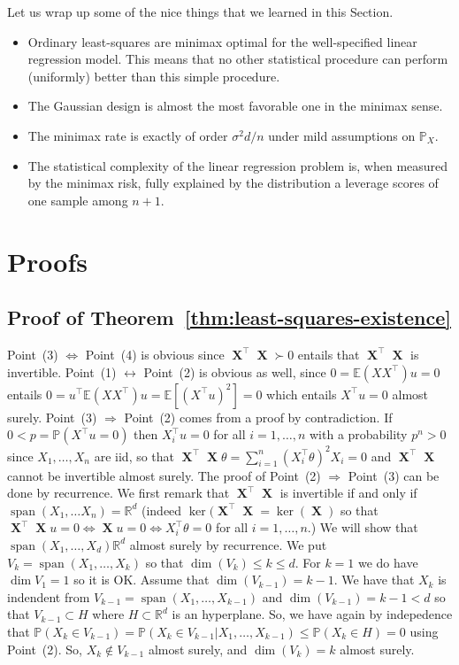 \documentclass[
	fontsize=11pt, %
	twoside=false, %
	numbers=noenddot, %
]{kaobook}
\DeclareMathOperator{\bX}{{\boldsymbol X}}
\DeclareMathOperator*{\spa}{span}
\renewcommand{\P}{\mathbb P}
\newcommand{\E}{\mathbb E}
\newcommand{\R}{\mathbb R}
\begin{document}
Let us wrap up some of the nice things that we learned in this Section.
\begin{itemize}
	\item Ordinary least-squares are minimax optimal for the well-specified linear regression model. This means that no other statistical procedure can perform (uniformly) better than this simple procedure.
	\item The Gaussian design is almost the most favorable one in the minimax sense.
	\item The minimax rate is exactly of order $\sigma^2 d / n$ under mild assumptions
	 on $\P_X$.
	\item The statistical complexity of the linear regression problem is, when measured by the minimax risk, fully explained by the distribution a leverage scores of one sample among $n+1$.
\end{itemize}


\section{Proofs} %
\label{sec:chap04_proofs}

\subsection{Proof of Theorem~\ref{thm:least-squares-existence}} %


Point~(3) $\Leftrightarrow$ Point~(4) is obvious since $\bX^\top \bX \succ 0$ entails that $\bX^\top \bX$ is invertible. Point~(1) $\leftrightarrow$ Point~(2) is obvious as well, since $0 = \E(X X^\top) u = 0$ entails $0 = u^\top \E(X X^\top) u = \E[ (X^\top u)^2] = 0$ which entails $X^\top u = 0$ almost surely. Point~(3) $\Rightarrow$ Point~(2) comes from a proof by contradiction. If $0 < p = \P(X^\top u = 0)$ then $X_i^\top u = 0$ for all $i=1, \ldots, n$ with a probability $p^n > 0$ since $X_1, \ldots, X_n$ are iid, so that $\bX^\top \bX \theta = \sum_{i=1}^n (X_i^\top \theta)^2 X_i = 0$ and $\bX^\top \bX$ cannot be invertible almost surely.
The proof of Point~(2) $\Rightarrow$ Point~(3) can be done by recurrence. We first remark that $\bX^\top \bX$ is invertible if and only if $\spa(X_1, \ldots X_n) = \R^d$ (indeed $\ker(\bX^\top \bX = \ker(\bX)$ so that $\bX^\top \bX u = 0 \Leftrightarrow \bX u = 0 \Leftrightarrow X_i^\top \theta = 0$ for all $i=1, \ldots, n$.) We will show that $\spa(X_1, \ldots, X_d) \R^d$ almost surely by recurrence. We put $V_k = \spa(X_1, \ldots, X_k)$ so that $\dim(V_k) \leq k \leq d$. For $k=1$ we do have $\dim V_1 = 1$ so it is OK. Assume that $\dim(V_{k-1}) = k-1$. We have that $X_k$ is indendent from $V_{k-1} = \spa(X_1, \ldots, X_{k-1})$ and $\dim(V_{k-1}) = k-1 < d$ so that $V_{k-1} \subset H$ where $H \subset \R^d$ is an hyperplane. So, we have again by indepedence that $\P(X_k \in V_{k-1}) = \P(X_k \in V_{k-1} | X_1, \ldots, X_{k-1}) \leq \P(X_k \in H) = 0$ using Point~(2). So, $X_k \notin V_{k-1}$ almost surely, and $\dim(V_k) = k$ almost surely.
\end{document}

